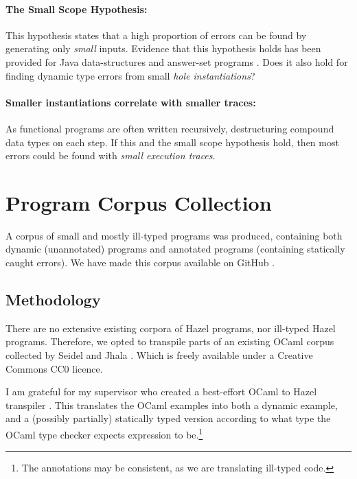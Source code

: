 \paragraph{The Small Scope Hypothesis: }
\label{sec:SmallScopeHypothesis} This hypothesis \cite{SmallScopeHypothesisOrigination} states that a high proportion of errors can be found by generating only \textit{small} inputs. Evidence that this hypothesis holds has been provided for Java data-structures \cite{SmallScopeHypothesis} and answer-set programs \cite{SmallScopeHypothesisAnswerSet}. Does it also hold for finding dynamic type errors from small \textit{hole instantiations}?

\paragraph{Smaller instantiations correlate with smaller traces: } As functional programs are often written recursively, destructuring compound data types on each step. If this and the small scope hypothesis hold, then most errors could be found with \textit{small execution traces}.

\section{Program Corpus Collection}\label{sec:CorpusCollection}

A corpus of small and mostly ill-typed programs was produced, containing both dynamic (unannotated) programs and annotated programs (containing statically caught errors). We have made this corpus available on GitHub \cite{HazelCorpus}.

\subsection{Methodology}
There are no extensive existing corpora of Hazel programs, nor ill-typed Hazel programs. Therefore, we opted to transpile parts of an existing OCaml corpus collected by Seidel and Jhala \cite{OCamlCorpus}. Which is freely available under a Creative Commons CC0 licence. 

I am grateful for my supervisor who created a best-effort OCaml to Hazel transpiler \cite{HazelOfOCaml}. This translates the OCaml examples into both a dynamic example, and a (possibly partially) statically typed version according to what type the OCaml type checker expects expression to be.\footnote{The annotations may be consistent, as we are translating ill-typed code.}

